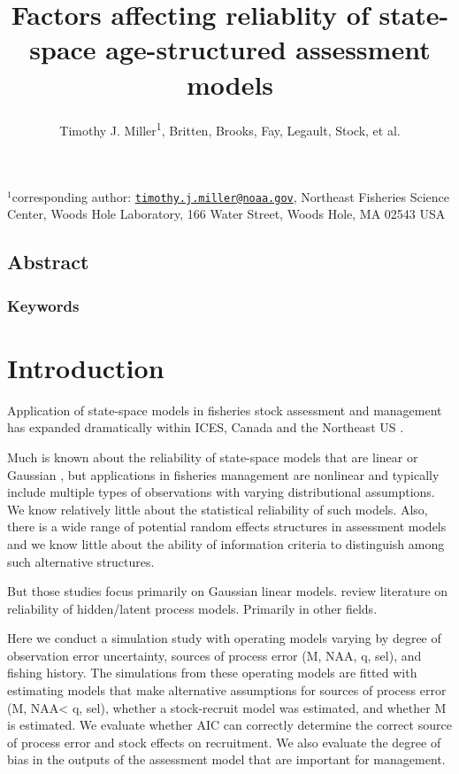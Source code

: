\documentclass[
  12pt,
]{article}
\title{Factors affecting reliablity of state-space age-structured
assessment models}
\author{Timothy J. Miller\textsuperscript{1}, Britten, Brooks, Fay,
Legault, Stock, et al.}
\date{}
\begin{document}
\maketitle

\(^1\)corresponding author:
\href{mailto:timothy.j.miller@noaa.gov}{\nolinkurl{timothy.j.miller@noaa.gov}},
Northeast Fisheries Science Center, Woods Hole Laboratory, 166 Water
Street, Woods Hole, MA 02543 USA\\

\pagebreak

\hypertarget{abstract}{%
\subsection*{Abstract}\label{abstract}}

\hypertarget{keywords}{%
\subsubsection*{Keywords}\label{keywords}}

\pagebreak

\hypertarget{introduction}{%
\section{Introduction}\label{introduction}}

Application of state-space models in fisheries stock assessment and
management has expanded dramatically within ICES, Canada and the
Northeast US \citep{nielsenberg14,cadigan16,stockmiller21}.

Much is known about the reliability of state-space models that are
linear or Gaussian \citep{aeberhardetal18}, but applications in
fisheries management are nonlinear and typically include multiple types
of observations with varying distributional assumptions. We know
relatively little about the statistical reliability of such models.
Also, there is a wide range of potential random effects structures in
assessment models and we know little about the ability of information
criteria to distinguish among such alternative structures.

But those studies focus primarily on Gaussian linear models. review
literature on reliability of hidden/latent process models. Primarily in
other fields.

Here we conduct a simulation study with operating models varying by
degree of observation error uncertainty, sources of process error (M,
NAA, q, sel), and fishing history. The simulations from these operating
models are fitted with estimating models that make alternative
assumptions for sources of process error (M, NAA\textless{} q, sel),
whether a stock-recruit model was estimated, and whether M is estimated.
We evaluate whether AIC can correctly determine the correct source of
process error and stock effects on recruitment. We also evaluate the
degree of bias in the outputs of the assessment model that are important
for management.
\end{document}
